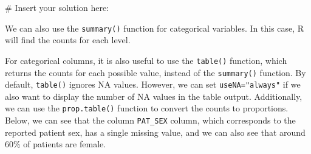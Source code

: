 \documentclass[
  letterpaper,
]{krantz}
\makeatletter
\newenvironment{Shaded}{\begin{snugshade}}{\end{snugshade}}
\newcommand{\AttributeTok}[1]{\textcolor[rgb]{0.40,0.45,0.13}{#1}}
\newcommand{\CommentTok}[1]{\textcolor[rgb]{0.37,0.37,0.37}{#1}}
\newcommand{\FunctionTok}[1]{\textcolor[rgb]{0.28,0.35,0.67}{#1}}
\newcommand{\NormalTok}[1]{\textcolor[rgb]{0.00,0.23,0.31}{#1}}
\newcommand{\SpecialCharTok}[1]{\textcolor[rgb]{0.37,0.37,0.37}{#1}}
\newcommand{\StringTok}[1]{\textcolor[rgb]{0.13,0.47,0.30}{#1}}
\newenvironment{kframe}{%
\medskip{}
\setlength{\fboxsep}{.8em}
 \def\at@end@of@kframe{}%
 \ifinner\ifhmode%
  \def\at@end@of@kframe{\end{minipage}}%
  \begin{minipage}{\columnwidth}%
 \fi\fi%
 \def\FrameCommand##1{\hskip\@totalleftmargin \hskip-\fboxsep
 \colorbox{shadecolor}{##1}\hskip-\fboxsep
     \hskip-\linewidth \hskip-\@totalleftmargin \hskip\columnwidth}%
 \MakeFramed {\advance\hsize-\width
   \@totalleftmargin\z@ \linewidth\hsize
   \@setminipage}}%
 {\par\unskip\endMakeFramed%
 \at@end@of@kframe}
\renewenvironment{Shaded}{\begin{kframe}}{\end{kframe}}
\makeatother
\begin{document}
\begin{Shaded}
\begin{Highlighting}[]
\CommentTok{\# Insert your solution here:}
\end{Highlighting}
\end{Shaded}

We can also use the \texttt{summary()} function for categorical
variables. In this case, R will find the counts for each level.

\begin{Shaded}
\end{Shaded}

For categorical columns, it is also useful to use the \texttt{table()}
function, which returns the counts for each possible value, instead of
the \texttt{summary()} function. By default, \texttt{table()} ignores NA
values. However, we can set \texttt{useNA="always"} if we also want to
display the number of NA values in the table output. Additionally, we
can use the \texttt{prop.table()} function to convert the counts to
proportions. Below, we can see that the column \texttt{PAT\_SEX} column,
which corresponds to the reported patient sex, has a single missing
value, and we can also see that around 60\% of patients are female.

\begin{Shaded}
\end{Shaded}

\begin{Shaded}
\end{Shaded}
\end{document}
